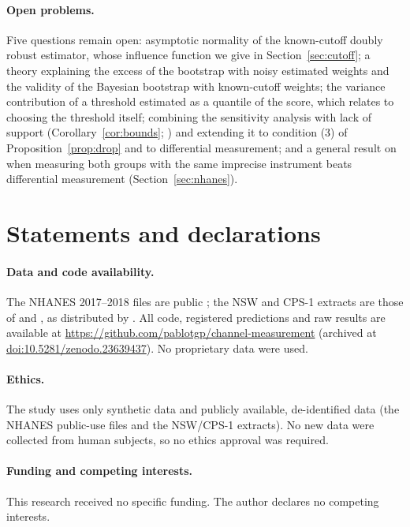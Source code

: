 \documentclass[twoside,11pt]{article}
\theoremstyle{plain}
\theoremstyle{definition}
\begin{document}
\paragraph{Open problems.} Five questions remain open: asymptotic normality of the known-cutoff doubly robust estimator, whose influence function we give in Section~\ref{sec:cutoff}; a theory explaining the excess of the bootstrap with noisy estimated weights and the validity of the Bayesian bootstrap with known-cutoff weights; the variance contribution of a threshold estimated as a quantile of the score, which relates to choosing the threshold itself; combining the sensitivity analysis with lack of support (Corollary~\ref{cor:bounds}; \citealp{manamkoong2025}) and extending it to condition (3) of Proposition~\ref{prop:drop} and to differential measurement; and a general result on when measuring both groups with the same imprecise instrument beats differential measurement (Section~\ref{sec:nhanes}).



\section*{Statements and declarations}

\paragraph{Data and code availability.} The NHANES 2017--2018 files are public \citep{nchs2020}; the NSW and CPS-1 extracts are those of \citet{dehejia1999} and \citet{lalonde1986}, as distributed by \citet{cunningham2021}. All code, registered predictions and raw results are available at \url{https://github.com/pablotgp/channel-measurement} (archived at \href{https://doi.org/10.5281/zenodo.23639437}{doi:10.5281/zenodo.23639437}). No proprietary data were used.

\paragraph{Ethics.} The study uses only synthetic data and publicly available, de-identified data (the NHANES public-use files and the NSW/CPS-1 extracts). No new data were collected from human subjects, so no ethics approval was required.

\paragraph{Funding and competing interests.} This research received no specific funding. The author declares no competing interests.
\end{document}
